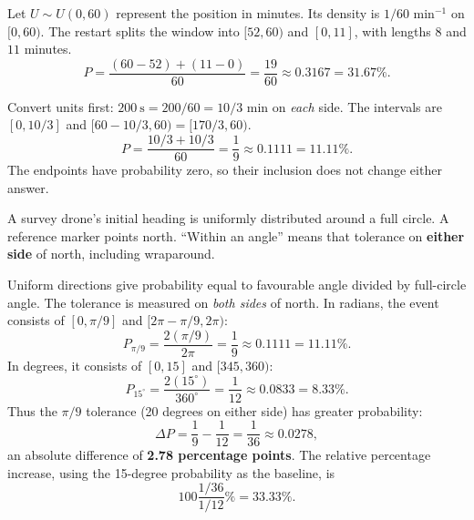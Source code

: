 
Let $U\sim U(0,60)$ represent the position in minutes. Its density is $1/60$ min$^{-1}$ on $[0,60)$.
The restart splits the window into $[52,60)$ and $[0,11]$, with lengths $8$ and $11$ minutes.
\[P=\frac{(60-52)+(11-0)}{60}=\boxed{\frac{19}{60}\approx0.3167=31.67\%}.\]

Convert units first: $200\ \mathrm{s}=200/60=10/3$ min on \emph{each} side.
The intervals are $[0,10/3]$ and $[60-10/3,60)=[170/3,60)$.
\[P=\frac{10/3+10/3}{60}=\boxed{\frac19\approx0.1111=11.11\%}.\]
The endpoints have probability zero, so their inclusion does not change either answer.

\clearpage\def\CurrentProblem{drone}
A survey drone's initial heading is uniformly distributed around a full circle. A reference marker points north. ``Within an angle'' means that tolerance on \textbf{either side} of north, including wraparound.


Uniform directions give probability equal to favourable angle divided by full-circle angle.
The tolerance is measured on \emph{both sides} of north.
In radians, the event consists of $[0,\pi/9]$ and $[2\pi-\pi/9,2\pi)$:
\[P_{\pi/9}=\frac{2(\pi/9)}{2\pi}=\boxed{\frac19\approx0.1111=11.11\%}.\]
In degrees, it consists of $[0,15]$ and $[345,360)$:
\[P_{15^\circ}=\frac{2(15^\circ)}{360^\circ}=\boxed{\frac1{12}\approx0.0833=8.33\%}.\]
Thus the $\pi/9$ tolerance (20 degrees on either side) has greater probability:
\[\Delta P=\frac19-\frac1{12}=\boxed{\frac1{36}\approx0.0278},\]
an absolute difference of \textbf{2.78 percentage points}.
The relative percentage increase, using the 15-degree probability as the baseline, is
\[100\frac{1/36}{1/12}\%=33.33\%.\]

